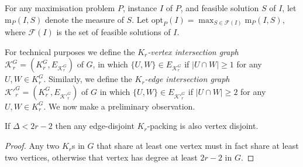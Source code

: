 For any maximisation problem $P$, instance $I$ of $P$, and feasible solution $S$ of $I$, let $\textrm{m}_{P}(I, S)$ denote the measure of $S$. Let $\textrm{opt}_{P}(I) = \max_{S \in \mathcal{F}(I)} \textrm{m}_{P}(I, S)$, where $\mathcal{F}(I)$ is the set of feasible solutions of $I$.

For technical purposes we define the \emph{$K_r$-vertex intersection graph} $\mathcal{K}_r^G = (K_r^G, E_{\mathcal{K}_r^G})$ of $G$, in which $\{ U, W \} \in E_{\mathcal{K}_r^G}$ if $|U \cap W| \geq 1$ for any $U, W \in K_r^G$. Similarly, we define the \emph{$K_r$-edge intersection graph} ${\mathcal{K}'}_r^G = (K_r^G, E_{{\mathcal{K}'}_r^G})$ of $G$ in which $\{ U, W \} \in E_{{\mathcal{K}'}_r^G}$ if $|U \cap W| \geq 2$ for any $U, W \in K_r^G$. We now make a preliminary observation.

\begin{observation}
\label{obs:krpacking_edkr_is_also_vdkr}
If $\Delta < 2r - 2$ then any edge-disjoint $K_r$-packing is also vertex disjoint.
\end{observation}
\begin{proof}
Any two $K_r$s in $G$ that share at least one vertex must in fact share at least two vertices, otherwise that vertex has degree at least $2r - 2$ in $G$.
\end{proof}